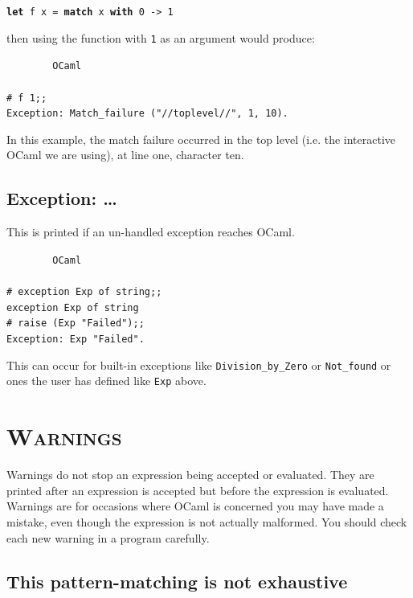 \documentclass[]{book}
\newcommand{\smspace}{\vspace{4mm}}
\begin{document}
\smspace
\textbf{\texttt{let}}\texttt{ f x = }\textbf{\texttt{match}}\texttt{ x }\textbf{\texttt{with}}\texttt{ 0 -> 1}
\smspace

\noindent then using the function with \texttt{1} as an argument would produce:

\smspace
\noindent\verb!        OCaml!\\
\noindent\\
\texttt{\# f 1;;}\\
\texttt{Exception:\ Match\_failure ("//toplevel//", 1, 10).}
\smspace

\noindent In this example, the match failure occurred in the top level (i.e. the interactive OCaml we are using), at line one, character ten.

\subsection*{Exception: \ldots}

This is printed if an un-handled exception reaches OCaml.

\smspace
\noindent\verb!        OCaml!\\
\noindent\\
\texttt{\# exception Exp of string;;}\\
\texttt{exception Exp of string}\\
\texttt{\# raise (Exp "Failed");;}\\
\texttt{Exception:\ Exp "Failed".}
\smspace

\noindent This can occur for built-in exceptions like \texttt{Division\_by\_Zero} or \texttt{Not\_found} or ones the user has defined like \texttt{Exp} above.

\section*{\scshape Warnings}

Warnings do not stop an expression being accepted or evaluated. They are printed after an expression is accepted but before the expression is evaluated. Warnings are for occasions where OCaml is concerned you may have made a mistake, even though the expression is not actually malformed. You should check each new warning in a program carefully.

\subsection*{This pattern-matching is not exhaustive}
\end{document}
